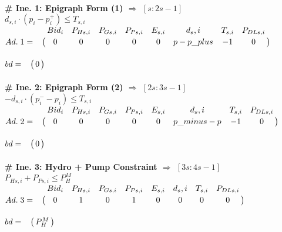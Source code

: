 \documentclass[10pt,a4paper]{article}
\let\bbordermatrix\bordermatrix
\begin{document}
\begin{flushleft}
\noindent\makebox[\linewidth]{\rule{16.5cm}{0.4pt}} \\[8pt]
 
\textbf{\# Ine. 1: Epigraph Form (1) $\Rightarrow$ $[s:2s-1]$} \\[8pt]
$\displaystyle{d_{s,i} \cdot (p_{i}-p_{i}^{+}) \leqslant T_{s,i}}$ \\[8pt]
$
Ad.\;1 = \bbordermatrix{
~ & Bid_i & P_{Hs,i} & P_{Gs,i} & P_{Ps,i} & E_{s,i} & d_s,i & T_{s,i} & P_{DLs,i} \cr
~ & 0      &   0      &0  &   0  &  0      &   p-p\_plus&-1   &0 \cr}
$\\[6pt]
$
bd = \bbordermatrix{~ \cr
              ~ & 0 \cr}
$\\[8pt]

\noindent\makebox[\linewidth]{\rule{16.5cm}{0.4pt}} \\[8pt]
\textbf{\# Ine. 2: Epigraph Form (2) $\Rightarrow$ $[2s:3s-1]$} \\[8pt]
$\displaystyle{-d_{s,i} \cdot (p_{i}^{-}-p_{i}) \leqslant T_{s,i}}$ \\[8pt]
$
Ad.\;2 = \bbordermatrix{
~ & Bid_i & P_{Hs,i} & P_{Gs,i} & P_{Ps,i} & E_{s,i} & d_s,i & T_{s,i} & P_{DLs,i} \cr
~ & 0      &   0      &0  &   0  &  0      &   p\_minus-p&-1   &0 \cr}
$\\[6pt]
$
bd = \bbordermatrix{~ \cr
              ~ & 0 \cr}
$\\[8pt]

\noindent\makebox[\linewidth]{\rule{16.5cm}{0.4pt}} \\[8pt]
\textbf{\# Ine. 3: Hydro + Pump Constraint $\Rightarrow$ $[3s:4s-1]$} \\[8pt]
$\displaystyle{P_{Hs,i} + P_{Ps,i} \leq P_H^M}$ \\[8pt]
$
Ad.\;3 = \bbordermatrix{
~ & Bid_i & P_{Hs,i} & P_{Gs,i} & P_{Ps,i} & E_{s,i} & d_s,i & T_{s,i} & P_{DLs,i} \cr
~ & 0      &   1      &0  &   1  &  0  &   0     &   0   &0 \cr}
$\\[6pt]
$
bd = \bbordermatrix{~ \cr
              ~ & P_H^M \cr}
$\\[8pt]

\end{flushleft}
\end{document}
